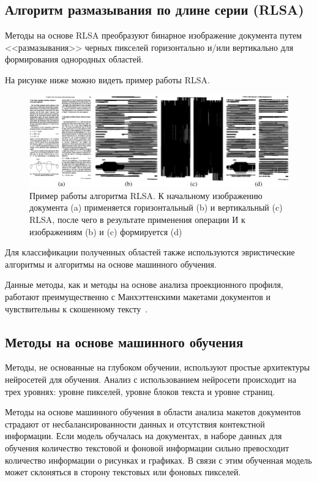 \subsection{Алгоритм размазывания по длине серии (RLSA)}

Методы на основе RLSA преобразуют бинарное изображение документа путем <<размазывания>> черных пикселей горизонтально и/или вертикально для формирования однородных областей.

На рисунке ниже можно видеть пример работы RLSA.

\begin{figure}[H]
	\centering
	\includegraphics[width=\textwidth]{img/rlsa.png}
    \caption{Пример работы алгоритма RLSA. К начальному изображению документа (a) применяется горизонтальный (b) и вертикальный (c) RLSA, после чего в результате применения операции И к изображениям (b) и (c) формируется (d)}
	\label{fig:}
\end{figure}

Для классификации полученных областей также используются эвристические алгоритмы и алгоритмы на основе машинного обучения.

Данные методы, как и методы на основе анализа проекционного профиля, работают преимущественно с Манхэттенскими макетами документов и чувствительны к скошенному тексту~\cite{dla-book}.

\subsection{Методы на основе машинного обучения}

Методы, не основанные на глубоком обучении, используют простые архитектуры нейросетей для обучения.
Анализ с использованием нейросети происходит на трех уровнях: уровне пикселей, уровне блоков текста и уровне страниц.

Методы на основе машинного обучения в области анализа макетов документов страдают от несбалансированности данных и отсутствия контекстной информации.
Если модель обучалась на документах, в наборе данных для обучения количество текстовой и фоновой информации сильно превосходит количество информации о рисунках и графиках.
В связи с этим обученная модель может склоняться в сторону текстовых или фоновых пикселей.~\cite{dla-survey}

